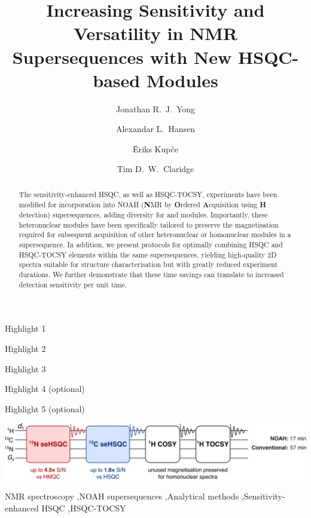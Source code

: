 \documentclass[final,twocolumn]{elsarticle}
\newcommand*{\carbon}{\ce{^{13}C}}
\newcommand*{\nitrogen}{\ce{^{15}N}}
\begin{document}
    \begin{frontmatter}
        \title{Increasing Sensitivity and Versatility in NMR Supersequences with New HSQC-based Modules}

        \address[oxford]{Chemistry Research Laboratory, Department of Chemistry, University of Oxford, Mansfield Road, Oxford, OX1 3TA, U.K.}
        \address[ohio]{Campus Chemical Instrument Center, The Ohio State University, 460 W.\ 12th Avenue, Columbus, OH, 43210 U.S.}
        \address[bruker]{Bruker UK Ltd., Banner Lane, Coventry, CV4 9GH, U.K.}

        \author[oxford]{Jonathan R.\ J.\ Yong}
        \author[ohio]{Alexandar L.\ Hansen}
        \author[bruker]{{\=E}riks Kup{\v{c}}e}
        \author[oxford]{Tim D.\ W.\ Claridge}
        \begin{abstract}
            The sensitivity-enhanced HSQC, as well as HSQC-TOCSY, experiments have been modified for incorporation into NOAH (\textbf{N}MR by \textbf{O}rdered \textbf{A}cquisition using \textbf{H} detection) supersequences, adding diversity for \carbon{} and \nitrogen{} modules.
            Importantly, these heteronuclear modules have been specifically tailored to preserve the magnetisation required for subsequent acquisition of other heteronuclear or homonuclear modules in a supersequence.
            In addition, we present protocols for optimally combining HSQC and HSQC-TOCSY elements within the same supersequences, yielding high-quality 2D spectra suitable for structure characterisation but with greatly reduced experiment durations.
            We further demonstrate that these time savings can translate to increased detection sensitivity per unit time.
        \end{abstract}
        \begin{highlights}
            \item Highlight 1
            \item Highlight 2
            \item Highlight 3
            \item Highlight 4 (optional)
            \item Highlight 5 (optional)
        \end{highlights}
        \begin{graphicalabstract}
            \includegraphics{toc_graphic.png}
        \end{graphicalabstract}
        \begin{keyword}
            NMR spectroscopy \sep NOAH supersequences \sep Analytical methods \sep Sensitivity-enhanced HSQC \sep HSQC-TOCSY
        \end{keyword}
    \end{frontmatter}
\end{document}
